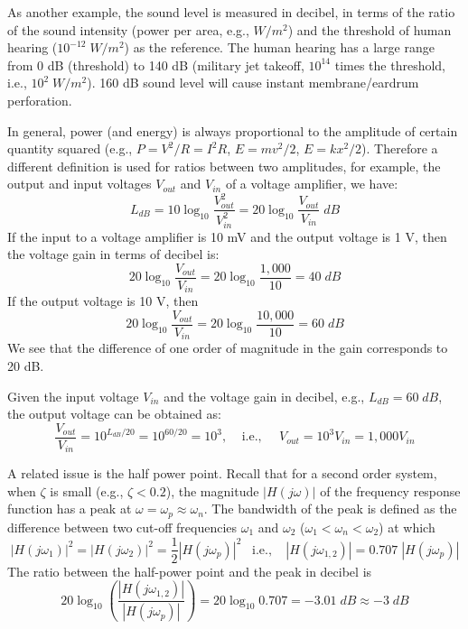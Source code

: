 \documentclass{article}
\begin{document}
As another example, the sound level is measured in decibel, in terms of the ratio
of the sound intensity (power per area, e.g., $W/m^2$) and the threshold of human 
hearing ($10^{-12}\; W/m^2$) as the reference. The human hearing has a large range 
from 0 dB (threshold) to 140 dB (military jet takeoff, $10^{14}$ times the threshold, 
i.e., $10^2\; W/m^2$). 160 dB sound level will cause instant membrane/eardrum 
perforation.

In general, power (and energy) is always proportional to the amplitude of certain
quantity squared (e.g., $P=V^2/R=I^2 R$, $E=mv^2/2$, $E=kx^2/2$). Therefore a 
different definition is used for ratios between two amplitudes, for example, the
output and input voltages $V_{out}$ and $V_{in}$ of a voltage amplifier, we have:
\begin{equation} 
  L_{dB}=10 \log_{10} \frac{V^2_{out}}{V^2_{in}}
  =20 \log_{10} \frac{V_{out}}{V_{in}}\;dB 
\end{equation}
If the input to a voltage amplifier is 10 mV and the output voltage is 1 V, then the
voltage gain in terms of decibel is:
\begin{equation}
  20 \log_{10} \frac{V_{out}}{V_{in}}=20 \log_{10} \frac{1,000}{10}=40\; dB 
\end{equation}
If the output voltage is 10 V, then
\begin{equation}
  20 \log_{10} \frac{V_{out}}{V_{in}}=20 \log_{10} \frac{10,000}{10}=60\; dB 
\end{equation}
We see that the difference of one order of magnitude in the gain corresponds to 20 dB.

Given the input voltage $V_{in}$ and the voltage gain in decibel, e.g., $L_{dB}=60\;dB$, 
the output voltage can be obtained as:
\begin{equation} 
  \frac{V_{out}}{V_{in}}=10^{L_{dB}/20}=10^{60/20}=10^3,
  \;\;\;\;\mbox{i.e.,}\;\;\;\;\; V_{out}=10^3 V_{in}=1,000 V_{in} 
\end{equation}

A related issue is the half power point. Recall that for a second order system, when
$\zeta$ is small (e.g., $\zeta<0.2$), the magnitude $|H(j\omega)|$ of the frequency 
response function has a peak at $\omega=\omega_p\approx \omega_n$. The bandwidth of 
the peak is defined as the difference between two cut-off frequencies $\omega_1$ 
and $\omega_2$ ($\omega_1<\omega_n < \omega_2$) at which 
\begin{equation} 
  |H(j\omega_1)|^2=|H(j\omega_2)|^2=\frac{1}{2} |H(j\omega_p)|^2\;\;\;\mbox{i.e.,}\;\;\;\;
  | H(j\omega_{1,2}) |=0.707\; | H(j\omega_p) | 
\end{equation}
The ratio between the half-power point and the peak in decibel is
\begin{equation}
  20 \log_{10} \left( \frac{ |H(j\omega_{1,2})|}{| H(j\omega_p) |} \right)
  =20 \log_{10} 0.707=-3.01\;dB \approx -3\;dB 
\end{equation}
\end{document}
